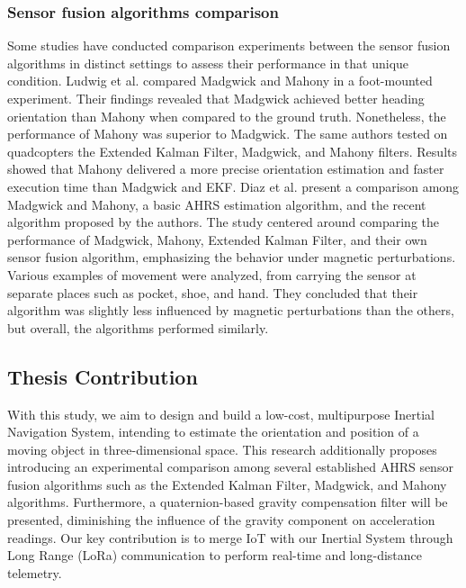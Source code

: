 \subsubsection{Sensor fusion algorithms comparison}
Some studies have conducted comparison experiments between the sensor fusion algorithms in distinct settings to assess their performance in that unique condition. Ludwig et al. \cite{ludwig2018comparison} compared Madgwick and Mahony in a foot-mounted experiment. Their findings revealed that Madgwick achieved better heading orientation than Mahony when compared to the ground truth. Nonetheless, the performance of Mahony was superior to Madgwick. The same authors tested on \cite{ludwig2018comparisonuav} quadcopters the Extended Kalman Filter, Madgwick, and Mahony filters. Results showed that Mahony delivered a more precise orientation estimation and faster execution time than Madgwick and EKF. Diaz et al. \cite{diaz2015evaluation} present a comparison among Madgwick and Mahony, a basic AHRS estimation algorithm, and the recent algorithm proposed by the authors. The study centered around comparing the performance of Madgwick, Mahony, Extended Kalman Filter, and their own sensor fusion algorithm, emphasizing the behavior under magnetic perturbations. Various examples of movement were analyzed, from carrying the sensor at separate places such as pocket, shoe, and hand. They concluded that their algorithm was slightly less influenced by magnetic perturbations than the others, but overall, the algorithms performed similarly.



\subsection{Thesis Contribution}
With this study, we aim to design and build a low-cost, multipurpose Inertial Navigation System, intending to estimate the orientation and position of a moving object in three-dimensional space. This research additionally proposes introducing an experimental comparison among several established AHRS sensor fusion algorithms such as the Extended Kalman Filter, Madgwick, and Mahony algorithms. Furthermore, a quaternion-based gravity compensation filter will be presented, diminishing the influence of the gravity component on acceleration readings. Our key contribution is to merge IoT with our Inertial System through Long Range (LoRa) communication to perform real-time and long-distance telemetry.